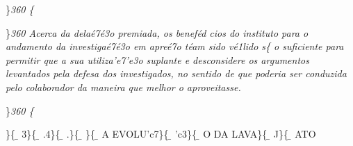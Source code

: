  \ltrch{} 
\par \}\pard \ltrpar\qj {}\sl360\widctlpar\wrapdefault\faauto{} \{\rtlch{}
 \ltrch{}  \tab 
\par \}\pard \ltrpar\qj {}\sl360\widctlpar\wrapdefault\faauto{} {\rtlch{}  \ltrch{}  Acerca da dela\'e7\'e3o premiada, }{\rtlch{}  \ltrch{}  os benef\'ed
cios do instituto para o andamento da investiga\'e7\'e3o em apre\'e7o t\'eam sido}{\rtlch{}  \ltrch{}   v\'e1lido}{\rtlch{}  \ltrch{}  s}\{\rtlch{}
 \ltrch{}  o suficiente para permitir que a sua
utiliza'e7'e3o suplante e desconsidere os argumentos levantados pela
defesa dos investigados, no sentido de que poderia ser conduzida pelo
colaborador da maneira que melhor o aproveitasse.
\par \}\pard \ltrpar\qj {}\sl360\widctlpar\wrapdefault\faauto{} \{\rtlch{}
 \ltrch{}  \par \}\{\rtlch{} \ab{}
\ltrch{} \b{} 3\}\{\rtlch{}
\ab{} \ltrch{} \b{}
.4\}\{\rtlch{} \ab{} \ltrch{} \b{}
.\}\{\rtlch{} \ab{} \ltrch{}
\b{} \}\{\rtlch{} \ab{}
\ltrch{} \b{} A
EVOLU'c7\}\{\rtlch{} \ab{} \ltrch{}
\b{} 'c3\}\{ \rtlch{}
\ab{} \ltrch{} \b{} O DA
LAVA\}\{\rtlch{} \ab{} \ltrch{}
\b{} J\}\{\rtlch{} \ab{}
\ltrch{} \b{} ATO

\par 

